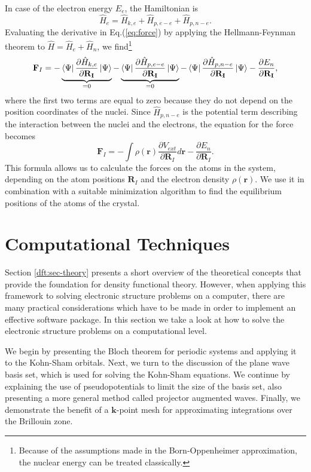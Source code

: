 \begin{refsection}
In case of the electron energy $E_e$, the Hamiltonian is
\begin{equation}
\hat{H}_e = \hat{H}_{k,e} + \hat{H}_{p,e-e} + \hat{H}_{p,n-e}.
\end{equation}
Evaluating the derivative in Eq.(\ref{eq:force}) by applying the Hellmann-Feynman theorem to $\hat{H} = \hat{H}_e + \hat{H}_n$, we find\footnote{Because of the assumptions made in the Born-Oppenheimer approximation, the nuclear energy can be treated classically.}
\begin{eqnarray}
\mathbf{F}_I = - \underbrace{\bra{\Psi} \frac{\partial\hat{H}_{k,e}}{\partial \mathbf{R_I}} \ket{\Psi}}_{=0} - \underbrace{\bra{\Psi} \frac{\partial\hat{H}_{p,e-e}}{\partial \mathbf{R_I}} \ket{\Psi}}_{=0} - \bra{\Psi} \frac{\partial\hat{H}_{p,n-e}}{\partial \mathbf{R_I}} \ket{\Psi} - \frac{\partial E_n}{\partial \mathbf{R_I}},
\end{eqnarray}
where the first two terms are equal to zero because they do not depend on the position coordinates of the nuclei. Since $\hat{H}_{p,n-e}$ is the potential term describing the interaction between the nuclei and the electrons, the equation for the force becomes
\begin{equation}
\mathbf{F}_I = - \int \rho(\mathbf{r}) \frac{\partial V_{ext}}{\partial \mathbf{R}_I}d\mathbf{r} - \frac{\partial E_n}{\partial\mathbf{R}_I}.
\end{equation}
This formula allows us to calculate the forces on the atoms in the system, depending on the atom positions $\mathbf{R}_I$ and the electron density $\rho(\mathbf{r})$. We use it in combination with a suitable minimization algorithm to find the equilibrium positions of the atoms of the crystal.

\section{Computational Techniques}\label{dft:sec-computational}

Section \ref{dft:sec-theory} presents a short overview of the theoretical concepts that provide the foundation for density functional theory. However, when applying this framework to solving electronic structure problems on a computer, there are many practical considerations which have to be made in order to implement an effective software package. In this section we take a look at how to solve the electronic structure problems on a computational level. 

We begin by presenting the Bloch theorem for periodic systems and applying it to the Kohn-Sham orbitals. Next, we turn to the discussion of the plane wave basis set, which is used for solving the Kohn-Sham equations.  We continue by explaining the use of pseudopotentials to limit the size of the basis set, also presenting a more general method called projector augmented waves. Finally, we demonstrate the benefit of a $\mathbf{k}$-point mesh for approximating integrations over the Brillouin zone.


\end{refsection}
